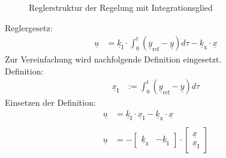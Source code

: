 \begin{figure}[H]
   \centering
   \caption[Reglerstruktur der I-Regelung]{Reglerstruktur der Regelung mit Integrationsglied}
   \label{fig:Bild11}
\end{figure}

Reglergesetz:
\begin{align}
    \underline{u} &= \underline{k}_{\mathrm{I}}\cdot\int_{0}^t(\underline{y}_{\mathrm{ref}}-\underline{y})d\tau-\underline{k}_{\mathrm{x}}\cdot\underline{x}
    \label{eq:Gleichung25}
\end{align}
\newline
Zur Vereinfachung wird nachfolgende Definition eingesetzt.\\
\newline
Definition:
\begin{align*}
    \underline{x}_{\mathrm{I}}& :=\int_{0}^t(\underline{y}_{\mathrm{ref}}-\underline{y})d\tau
\end{align*}
\newline
Einsetzen der Definition:
\begin{align}
    \underline{u} &= \underline{k}_{\mathrm{I}}\cdot\underline{x}_{\mathrm{I}}-\underline{k}_{\mathrm{x}}\cdot\underline{x} \\ \nonumber \\
    \underline{u} &= -
    \begin{bmatrix}
        \underline{k}_{\mathrm{x}} & -\underline{k}_{\mathrm{I}}
    \end{bmatrix}
    \cdot
    \begin{bmatrix}
        \underline{x} \\
        \underline{x}_{\mathrm{I}}
    \end{bmatrix}
    \nonumber
\end{align}

